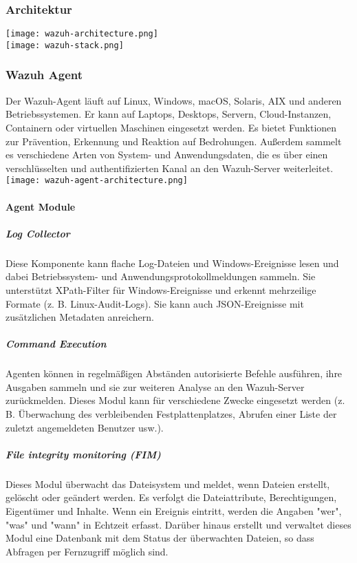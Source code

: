 \subsubsection{Architektur}
\texttt{[image: wazuh-architecture.png]}\\
\texttt{[image: wazuh-stack.png]}

\subsubsection{Wazuh Agent}
Der Wazuh-Agent läuft auf Linux, Windows, macOS, Solaris, AIX und anderen Betriebssystemen.
Er kann auf Laptops, Desktops, Servern, Cloud-Instanzen, Containern oder virtuellen Maschinen eingesetzt werden.
Es bietet Funktionen zur Prävention, Erkennung und Reaktion auf Bedrohungen.
Außerdem sammelt es verschiedene Arten von System- und Anwendungsdaten, die es über einen verschlüsselten und authentifizierten Kanal an den Wazuh-Server weiterleitet.\\

\texttt{[image: wazuh-agent-architecture.png]}

\paragraph{Agent Module}
\subparagraph{Log Collector}
Diese Komponente kann flache Log-Dateien und Windows-Ereignisse lesen und dabei Betriebssystem- und Anwendungsprotokollmeldungen sammeln. 
Sie unterstützt XPath-Filter für Windows-Ereignisse und erkennt mehrzeilige Formate (z. B. Linux-Audit-Logs). 
Sie kann auch JSON-Ereignisse mit zusätzlichen Metadaten anreichern.

\subparagraph{Command Execution}
Agenten können in regelmäßigen Abständen autorisierte Befehle ausführen, ihre Ausgaben sammeln und sie zur weiteren Analyse an den Wazuh-Server zurückmelden.
Dieses Modul kann für verschiedene Zwecke eingesetzt werden (z. B. Überwachung des verbleibenden Festplattenplatzes, Abrufen einer Liste der zuletzt angemeldeten Benutzer usw.).

\subparagraph{File integrity monitoring (FIM)}
Dieses Modul überwacht das Dateisystem und meldet, wenn Dateien erstellt, gelöscht oder geändert werden. 
Es verfolgt die Dateiattribute, Berechtigungen, Eigentümer und Inhalte. 
Wenn ein Ereignis eintritt, werden die Angaben "wer", "was" und "wann" in Echtzeit erfasst. 
Darüber hinaus erstellt und verwaltet dieses Modul eine Datenbank mit dem Status der überwachten Dateien, so dass Abfragen per Fernzugriff möglich sind.

